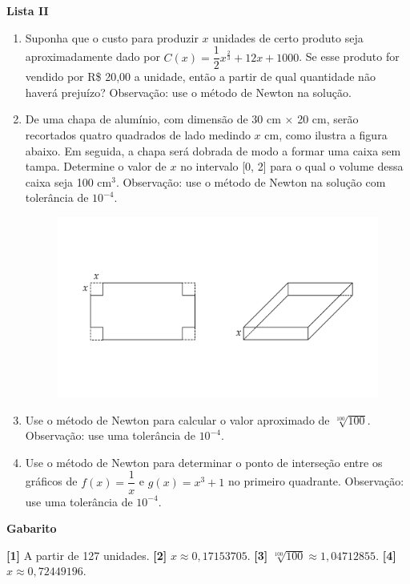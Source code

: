 \documentclass[12pt,a4paper]{article}
\begin{document}
\begin{center}
  \textbf{Lista II}
\end{center}

\begin{enumerate}
  \item Suponha que o custo para produzir $x$ unidades de certo produto seja aproximadamente 
  dado por $C(x) = \dfrac{1}{2}x^{\frac{2}{3}} + 12x + 1000$. Se esse produto for vendido por
  R\$ 20,00 a unidade, então a partir de qual quantidade não haverá prejuízo? Observação: 
  use o método de Newton na solução.

  \item De uma chapa de alumínio, com dimensão de 30 cm $\times$ 20 cm, serão recortados quatro
  quadrados de lado medindo $x$ cm, como ilustra a figura abaixo. Em seguida, a chapa será dobrada
  de modo a formar uma caixa sem tampa. Determine o valor de $x$ no intervalo [0, 2] para o qual 
  o volume dessa caixa seja 100 cm$^3$. Observação: use o método de Newton na solução com tolerância
  de $10^{-4}$.
  
  \begin{figure}[h]
    \centering
    \includegraphics[scale=0.4]{imagem/caixa-retangular.pdf}
  \end{figure}

  \item Use o método de Newton para calcular o valor aproximado de $\sqrt[100]{100}$.
  Observação: use uma tolerância de $10^{-4}$.

  \item Use o método de Newton para determinar o ponto de interseção entre os
  gráficos de $f(x) = \dfrac{1}{x}$ e $g(x) = x^3 + 1$ no primeiro quadrante. 
  Observação: use uma tolerância de $10^{-4}$.
    
\end{enumerate}

\begin{center}
  \textbf{Gabarito}
\end{center}
  \textbf{[1]} A partir de 127 unidades. 
  \textbf{[2]} $x \approx 0,17153705$. 
  \textbf{[3]} $\sqrt[100]{100} \approx 1,04712855$. 
  \textbf{[4]} $x \approx 0,72449196$.
\end{document}
